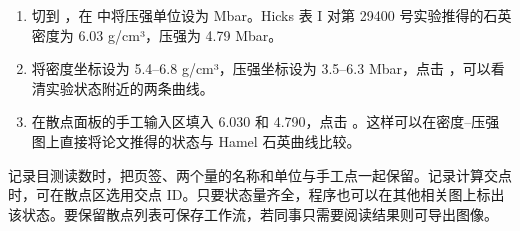 \begin{enumerate}
\item 切到 ，在  中将压强单位设为 Mbar。Hicks 表 I 对第 29400 号实验推得的石英密度为 6.03 g/cm³，压强为 4.79 Mbar。
\item 将密度坐标设为 5.4–6.8 g/cm³，压强坐标设为 3.5–6.3 Mbar，点击 ，可以看清实验状态附近的两条曲线。
\item 在散点面板的手工输入区填入 6.030 和 4.790，点击 。这样可以在密度–压强图上直接将论文推得的状态与 Hamel 石英曲线比较。
\end{enumerate}
记录目测读数时，把页签、两个量的名称和单位与手工点一起保留。记录计算交点时，可在散点区选用交点 ID。只要状态量齐全，程序也可以在其他相关图上标出该状态。要保留散点列表可保存工作流，若同事只需要阅读结果则可导出图像。
